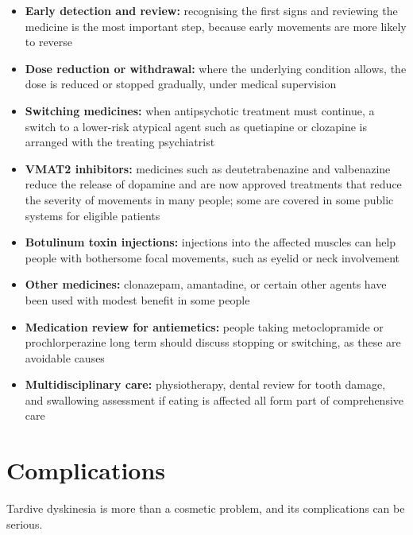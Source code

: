 \begin{itemize}
    \item \textbf{Early detection and review:} recognising the first signs and reviewing the medicine is the most important step, because early movements are more likely to reverse
    \item \textbf{Dose reduction or withdrawal:} where the underlying condition allows, the dose is reduced or stopped gradually, under medical supervision
    \item \textbf{Switching medicines:} when antipsychotic treatment must continue, a switch to a lower-risk atypical agent such as quetiapine or clozapine is arranged with the treating psychiatrist
    \item \textbf{VMAT2 inhibitors:} medicines such as deutetrabenazine and valbenazine reduce the release of dopamine and are now approved treatments that reduce the severity of movements in many people; some are covered in some public systems for eligible patients
    \item \textbf{Botulinum toxin injections:} injections into the affected muscles can help people with bothersome focal movements, such as eyelid or neck involvement
    \item \textbf{Other medicines:} clonazepam, amantadine, or certain other agents have been used with modest benefit in some people
    \item \textbf{Medication review for antiemetics:} people taking metoclopramide or prochlorperazine long term should discuss stopping or switching, as these are avoidable causes
    \item \textbf{Multidisciplinary care:} physiotherapy, dental review for tooth damage, and swallowing assessment if eating is affected all form part of comprehensive care
\end{itemize}

\section*{Complications}
Tardive dyskinesia is more than a cosmetic problem, and its complications can be serious.

